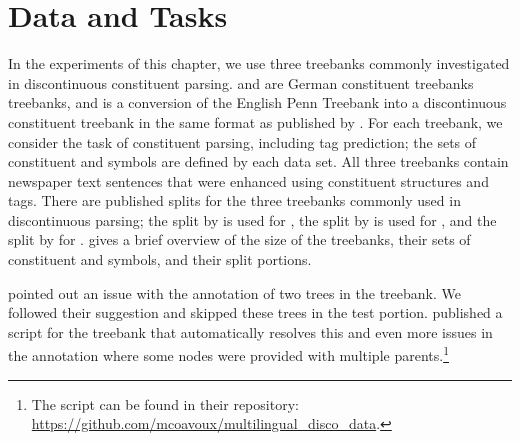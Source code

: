 \documentclass[../../document.tex]{subfiles}
\begin{document}
    \section{Data and Tasks}\label{sec:treebanks}
    In the experiments of this chapter, we use three treebanks commonly investigated in discontinuous constituent parsing.
     \citep{Skut98} and \tiger{} \citep{Brants04} are German constituent treebanks treebanks, and \dptb{} is a conversion of the English Penn Treebank \citep{Marcus94} into a discontinuous constituent treebank in the same format as \negra{} published by \citet{EvaKal11}.
    For each treebank, we consider the task of constituent parsing, including  tag prediction; the sets of constituent and  symbols are defined by each data set.
    All three treebanks contain newspaper text sentences that were enhanced using constituent structures and  tags.
    There are published splits for the three treebanks commonly used in discontinuous parsing; the split by \citet{DubKel03} is used for \negra{}, the split by \citet{Sed13} is used for  \tiger{}, and the split by \citet{collins-1996-new} for \dptb{}.
     gives a brief overview of the size of the treebanks, their sets of constituent and  symbols, and their split portions.
    
    \citet{Maier15} pointed out an issue with the annotation of two trees in the \tiger{} treebank.
    We followed their suggestion and skipped these trees in the test portion.
    \citet{CoaCoh19} published a script for the \tiger{} treebank that automatically resolves this and even more issues in the annotation where some nodes were provided with multiple parents.\footnote{The script can be found in their repository: \url{https://github.com/mcoavoux/multilingual_disco_data}.}
\end{document}
